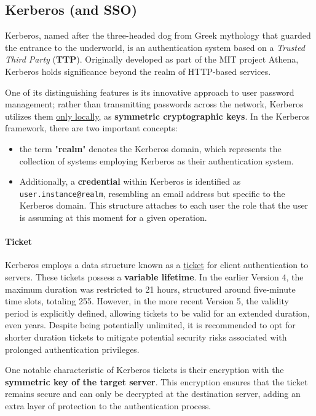 \subsection{Kerberos (and SSO)}

Kerberos, named after the three-headed dog from Greek mythology that guarded the entrance to the underworld, is an authentication system based on a \textit{Trusted Third Party} (\textbf{TTP}). 
Originally developed as part of the MIT project Athena, Kerberos holds significance beyond the realm of HTTP-based services. 

One of its distinguishing features is its innovative approach to user password management; rather than transmitting passwords across the network, Kerberos utilizes them \underline{only locally}, as \textbf{symmetric cryptographic keys}. 
In the Kerberos framework, there are two important concepts:
\begin{itemize}
  \item the term "\textbf{realm}" denotes the Kerberos domain, which represents the collection of systems employing Kerberos as their authentication system.
  \item Additionally, a \textbf{credential} within Kerberos is identified as \texttt{user.instance@realm}, resembling an email address but specific to the Kerberos domain. This structure attaches to each user the role that the user is assuming at this moment for a given operation.
\end{itemize}


\paragraph{Ticket}
Kerberos employs a data structure known as a \underline{ticket} for client authentication to servers. These tickets possess a \textbf{variable lifetime}. In the earlier Version 4, the maximum duration was restricted to 21 hours, structured around five-minute time slots, totaling 255. However, in the more recent Version 5, the validity period is explicitly defined, allowing tickets to be valid for an extended duration, even years. Despite being potentially unlimited, it is recommended to opt for shorter duration tickets to mitigate potential security risks associated with prolonged authentication privileges.

One notable characteristic of Kerberos tickets is their encryption with the \textbf{symmetric key of the target server}. This encryption ensures that the ticket remains secure and can only be decrypted at the destination server, adding an extra layer of protection to the authentication process.

